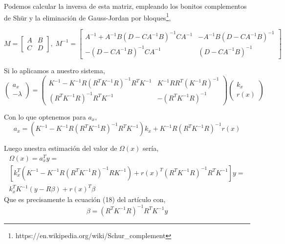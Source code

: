 \documentclass[10pt,a4paper]{report}
\begin{document}
Podemos calcular la inversa de esta matriz, empleando los bonitos complementos de Shür y la eliminación de Gauss-Jordan por bloques\footnote{
https://en.wikipedia.org/wiki/Schur\_complement},

\begin{equation*}
M = \begin{bmatrix}
A & B\\
C & D
\end{bmatrix},\; M^{-1} = \begin{bmatrix}
A^{-1}+A^{-1}B(D-CA^{-1}B)^{-1}CA^{-1} & -A^{-1}B(D-CA^{-1}B)^{-1}\\
-(D-CA^{-1}B)^{-1}CA^{-1} & (D-CA^{-1}B)^{-1}
\end{bmatrix}
\end{equation*}

Si lo aplicamos a nuestro sistema,
\begin{equation}
 \begin{pmatrix}
a_x \\ -\lambda
\end{pmatrix}= \begin{pmatrix}
K^{-1}-K^{-1}R(R^TK^{-1}R)^{-1}R^TK^{-1} & K^{-1}RR^T(K^{-1}R)^{-1}\\
(R^TK^{-1}R)^{-1}R^TK^{-1} & -(R^TK^{-1}R)^{-1}
\end{pmatrix}\begin{pmatrix} k_x \\ r(x)
\end{pmatrix}
\end{equation}

Con lo que optenemos para $a_x$,
\begin{equation}
a_x = (K^{-1}-K^{-1}R(R^TK^{-1}R)^{-1}R^TK^{-1})k_x +  K^{-1}R(R^TK^{-1}R)^{-1}r(x)
\end{equation}

Luego nuestra estimación del valor de $\Omega(x)$ sería,
\begin{equation}
\begin{split}
\Omega(x) = a_x^Ty =\\
\left[k_x^T(K^{-1}-K^{-1}R(R^TK^{-1}R)^{-1}RK^{-1})+r(x)^T(R^TK^{-1}R)^{-1}R^TK^{-1}\right]y=\\
k_x^TK^{-1}(y-R\beta)+r(x)^T\beta
\end{split}
\end{equation}
Que es precisamente la ecuación (18) del artículo con,
\begin{equation}
\beta = (R^TK^{-1}R)^{-1}R^TK^{-1}y
\end{equation}
\end{document}
